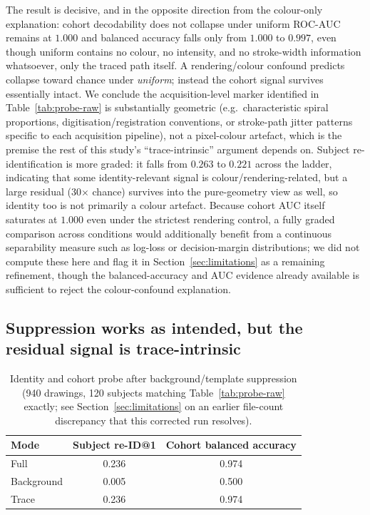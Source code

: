 \documentclass[3p,final,10pt]{elsarticle}
\let\oldsubsection\subsection
\renewcommand{\subsection}{\FloatBarrier\oldsubsection}
\begin{document}
The result is decisive, and in the opposite direction from the colour-only
explanation: cohort decodability does not collapse under uniform ROC-AUC remains at $1.000$ and balanced accuracy falls only from $1.000$
to $0.997$, even though uniform contains no colour, no
intensity, and no stroke-width information whatsoever, only the traced
path itself. A rendering/colour confound predicts collapse toward chance
under \textit{uniform}; instead the cohort signal survives essentially
intact. We conclude the acquisition-level marker identified in
Table~\ref{tab:probe-raw} is substantially geometric (e.g.\ characteristic
spiral proportions, digitisation/registration conventions, or stroke-path
jitter patterns specific to each acquisition pipeline), not a pixel-colour
artefact, which is the premise the rest of this study's ``trace-intrinsic''
argument depends on. Subject re-identification is more graded: it falls
from $0.263$ to $0.221$ across the ladder, indicating that some
identity-relevant signal is colour/rendering-related, but a large residual
(30$\times$ chance) survives into the pure-geometry view as well, so
identity too is not primarily a colour artefact. Because cohort AUC itself
saturates at $1.000$ even under the strictest rendering control, a fully
graded comparison across conditions would additionally benefit from a
continuous separability measure such as log-loss or decision-margin
distributions; we did not compute these here and flag it in
Section~\ref{sec:limitations} as a remaining refinement, though the
balanced-accuracy and AUC evidence already available is sufficient to
reject the colour-confound explanation.

\subsection{Suppression works as intended, but the residual signal is trace-intrinsic}

\begin{table}[H]
\centering
\caption{Identity and cohort probe after background/template suppression
(940 drawings, 120 subjects matching Table~\ref{tab:probe-raw} exactly;
see Section~\ref{sec:limitations} on an earlier file-count discrepancy that
this corrected run resolves).}
\label{tab:probe-supp}
\begin{tabular}{lcc}
\toprule
Mode & Subject re-ID@1 & Cohort balanced accuracy \\
\midrule
Full        & 0.236 & 0.974 \\
Background  & 0.005 & 0.500 \\
Trace       & 0.236 & 0.974 \\
\bottomrule
\end{tabular}
\end{table}
\end{document}
